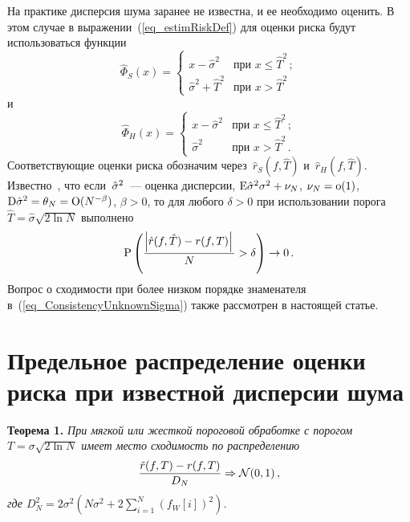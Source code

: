 \begin{multicols}{2}
На практике дисперсия шума заранее не известна, и ее необходимо оценить. В этом случае в выражении~(\ref{eq_estimRiskDef}) 
для оценки риска будут использоваться функции
\begin{equation*}
\hat\Phi_S(x)=\begin{cases}
x-\hat\sigma^2 & \text{при } x\leq \hat T^2\,;\\
\hat\sigma^2+\hat T^2 & \text{при } x> \hat T^2
\end{cases}
\end{equation*}
и
\begin{equation*}
\hat\Phi_H(x)=\begin{cases}
x-\hat\sigma^2 & \text{при } x\leq \hat T^2\,;\\
\hat\sigma^2 & \text{при } x> \hat T^2\,.
\end{cases}
\end{equation*}
Соответствующие оценки риска обозначим через~$\hat{r}_S(f,\hat T)$ и~$\hat{r}_H(f,\hat T)$. 
Известно~\cite{1mar}, что ес\-ли~$\hat\sigma^2$~--- оценка дисперсии, 
$\textrm{E}\hat\sigma^2\sigma^2+\nu_N$, $\nu_N=\textrm{o}(1)$, 
$\textrm{D}\hat\sigma^2=\theta_N=\textrm{O}(N^{-\beta})$, $\beta>0$, 
то для любого $\delta>0$ при использовании порога $\hat T=\hat\sigma\sqrt{2\ln N}$ вы\-пол\-нено
\begin{equation}
\label{eq_ConsistencyUnknownSigma}
\textrm{P}\left(\displaystyle\frac{\displaystyle \left|\hat{r}(f,\hat T)-r(f,T)\right|\mathstrut}{\displaystyle N\mathstrut}>\delta\right)\rightarrow 0\,.
\end{equation}
Вопрос о сходимости при более низком порядке знаменателя в~(\ref{eq_ConsistencyUnknownSigma}) 
также рассмотрен в настоящей статье.

\section{Предельное распределение оценки риска при известной дисперсии шума}

\noindent
\textbf{Теорема 1.} \textit{ %
При мягкой или жесткой пороговой обработке с порогом $T=\sigma\sqrt{2\ln N}$ имеет место сходимость по распределению
\begin{equation*}
\displaystyle\frac{\displaystyle \tilde{r}(f,T)-r(f,T)\mathstrut}{\displaystyle D_N\mathstrut}\Rightarrow \mathcal{N}(0,1)\,,
\end{equation*}
где $D_N^2=2\sigma^2\left(N\sigma^2+2\sum\limits_{i=1}^N \left(f_W[i]\right)^2\right)$.
}

\smallskip


\end{multicols}
